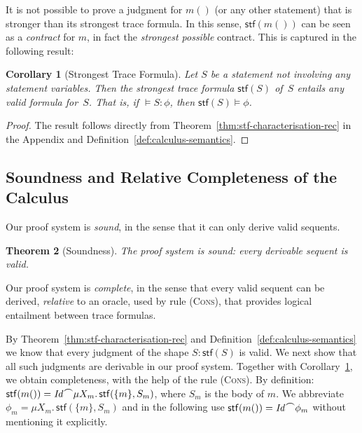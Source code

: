 \documentclass[10pt,a4paper]{amsart}
\newtheorem{theorem}{Theorem}[section]
\newtheorem{corollary}[theorem]{Corollary}
\theoremstyle{definition}
\newcommand{\chop}[0]{\raisebox{1ex}{$\frown$}}
\newcommand{\stfs}[1]{\mathsf{stf} (#1)}
\newcommand{\stfh}[2]{\mathsf{stf}(#1, #2)}
\newcommand{\judge}[2]{#1 : #2}
\begin{document}
It is not possible to prove a judgment for $m()$ (or any other
statement) that is stronger than its strongest trace formula. In this
sense, $\stfs{m()}$ can be seen as a \emph{contract} for $m$, in fact
the \emph{strongest possible} contract. This is captured in the
following result:

\begin{corollary}[Strongest Trace Formula]
  \label{cor:stf-strongest}
  Let $S$ be a statement not involving any statement variables. Then
  the strongest trace formula $\stfs{S}$ of~$S$ entails any valid
  formula for~$S$.
  That is, if $\models \judge{S}{\phi}$, then $\stfs{S} \models \phi$.
\end{corollary}

\begin{proof}
  The result follows directly from
  Theorem~\ref{thm:stf-characterisation-rec} in the Appendix and
  Definition~\ref{def:calculus-semantics}.  %
\end{proof}


\subsection{Soundness and Relative Completeness of the Calculus} 

Our proof system is \emph{sound}, in the sense that it can only
derive valid sequents.
%


\begin{theorem}[Soundness]
  \label{thm:calculus-soundness}
  The proof system is sound: every derivable sequent is valid.
\end{theorem}




Our proof system is \emph{complete}, in the sense that every valid
sequent can be derived, \emph{relative} to an oracle, used by rule
(\textsc{Cons}), that provides logical entailment between trace
formulas.

By Theorem~\ref{thm:stf-characterisation-rec} and 
Definition~\ref{def:calculus-semantics} we know that every judgment
of the shape $\judge{S}{\stfs{S}}$ is valid. 
%
We next show that all such judgments are derivable in our proof system.
%
Together with Corollary~\ref{cor:stf-strongest}, we obtain completeness,
with the help of the rule (\textsc{Cons}).
%
By definition:
$
  \stfs{m()}=\mathit{Id}\chop\mu X_m.\,\stfh{\{m\}}{S_m} %
$,
%
where $S_m$ is the body of $m$. We abbreviate
$\phi_m=\mu X_m.\,\stfh{\{m\}}{S_m}$ and in the following use
$\stfs{m()}=\mathit{Id}\chop\phi_m$ without mentioning it explicitly.
\end{document}
